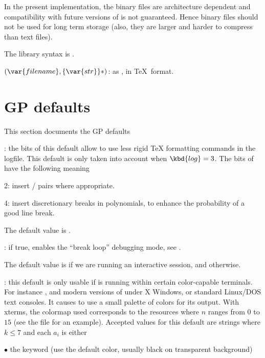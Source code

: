 In the present implementation, the binary files are architecture dependent
and compatibility with future versions of  is not guaranteed. Hence
binary files should not be used for long term storage (also, they are
larger and harder to compress than text files).

The library syntax is .

$(\var{filename},\{\var{str}\}*)$: \label{se:writetex}as , in \TeX\ format.

\section{GP defaults}
\label{se:gp_defaults} This section documents the GP defaults


: \label{se:def,TeXstyle}the bits of this default allow
 to use less rigid TeX formatting commands in the logfile. This
default is only taken into account when $\kbd{log} = 3$. The bits of
 have the following meaning

2: insert  /  pairs where appropriate.

4: insert discretionary breaks in polynomials, to enhance the probability of
a good line break.

The default value is .

: \label{se:def,breakloop}if true, enables the ``break loop'' debugging mode, see
.

The default value is  if we are running an interactive 
session, and  otherwise.

: \label{se:def,colors}this default is only usable if 
is running within certain color-capable terminals. For instance ,
 and modern versions of  under X Windows, or
standard Linux/DOS text consoles. It causes  to use a small palette of
colors for its output. With xterms, the colormap used corresponds to the
resources  where $n$ ranges from $0$ to $15$ (see the
file  for an example). Accepted values for this
default are strings  where $k\le7$ and each
$a_i$ is either

\noindent $\bullet$ the keyword  (use the default color, usually
black on transparent background)

